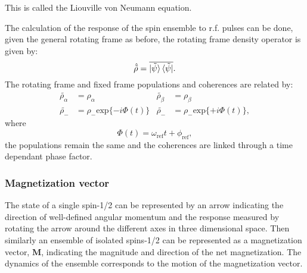 This is called the Liouville von Neumann equation.

The calculation of the response of the spin ensemble to r.f. pulses can be done, given the
general rotating frame as before, the rotating frame density operator is given by:
\begin{equation}
  \hat{\tilde{\rho}} = \overline{\ket{\tilde{\psi}}\bra{\tilde{\psi}}}.
\end{equation}
The rotating frame and fixed frame populations and coherences are related by:
\begin{align}\label{eqn:DensityRotFrame}
  \tilde{\rho_\alpha} &= \rho_\alpha & \tilde{\rho_\beta} &= \rho_\beta\\
  \tilde{\rho_-} &= \rho_-\text{exp}\{-i\Phi(t)\} & \tilde{\rho_-} &= \rho_-\text{exp}\{+i\Phi(t)\},
\end{align}
where
\begin{equation}
  \Phi(t) = \omega_{\text{ref}}t + \phi_{\text{ref}},
\end{equation}
the populations remain the same and the coherences are linked through a time dependant phase factor.

\subsubsection{Magnetization vector}

The state of a single spin-1/2 can be represented by an arrow indicating the direction of well-defined angular momentum and
the response measured by rotating the arrow around the different axes in three dimensional space. Then similarly
an ensemble of isolated spins-1/2 can be represented as a magnetization vector, $\mathbf{M}$, indicating the magnitude
and direction of the net magnetization. The dynamics of the ensemble corresponds to the motion of the magnetization vector.

